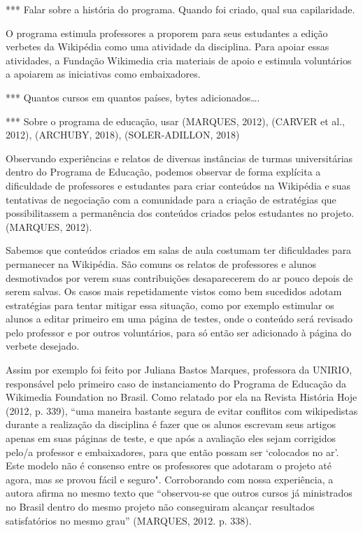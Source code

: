 *** Falar sobre a história do programa. Quando foi criado, qual sua capilaridade. 

O programa estimula professores a proporem para seus estudantes a edição verbetes da Wikipédia como uma atividade da disciplina. Para apoiar essas atividades, a Fundação Wikimedia cria materiais de apoio e estimula voluntários a apoiarem as iniciativas como embaixadores.
    
***  Quantos cursos em quantos países, bytes adicionados….

*** Sobre o programa de educação, usar (MARQUES, 2012), (CARVER et al., 2012), (ARCHUBY, 2018), (SOLER-ADILLON, 2018)

Observando experiências e relatos de diversas instâncias de turmas universitárias dentro do Programa de Educação, podemos observar de forma explícita a dificuldade de professores e estudantes para criar conteúdos na Wikipédia e suas tentativas de negociação com a comunidade para a criação de estratégias que possibilitassem a permanência dos conteúdos criados pelos estudantes no projeto.(MARQUES, 2012).

Sabemos que conteúdos criados em salas de aula costumam ter dificuldades para permanecer na Wikipédia. São comuns os relatos de professores e alunos desmotivados por verem suas contribuições desaparecerem do ar pouco depois de serem salvas. Os casos mais repetidamente vistos como bem sucedidos adotam estratégias para tentar mitigar essa situação, como por exemplo estimular os alunos a editar primeiro em uma página de testes, onde o conteúdo será revisado pelo professor e por outros voluntários, para só então ser adicionado à página do verbete desejado.

Assim por exemplo foi feito por Juliana Bastos Marques, professora da UNIRIO, responsável pelo primeiro caso de instanciamento do Programa de Educação da Wikimedia Foundation no Brasil. Como relatado por ela na Revista História Hoje (2012, p. 339), ``uma maneira bastante segura de evitar conflitos com wikipedistas durante a realização da disciplina é fazer que os alunos escrevam seus artigos apenas em suas páginas de teste, e que após a avaliação eles sejam corrigidos pelo/a professor e embaixadores, para que então possam ser ‘colocados no ar’. Este modelo não é consenso entre os professores que adotaram o projeto até agora, mas se provou fácil e seguro". Corroborando com nossa experiência, a autora afirma no mesmo texto que “observou-se que outros cursos já ministrados no Brasil dentro do mesmo projeto não conseguiram alcançar resultados satisfatórios no mesmo grau'' (MARQUES, 2012. p. 338).

